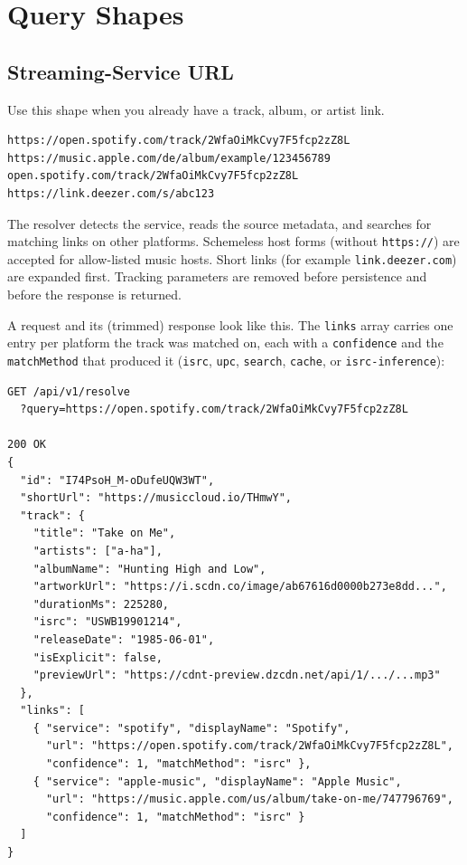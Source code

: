 \documentclass[11pt,a4paper]{article}
\newcommand{\code}[1]{\texttt{#1}}
\begin{document}
\section{Query Shapes}

\subsection{Streaming-Service URL}

Use this shape when you already have a track, album, or artist link.

\begingroup\small\begin{verbatim}
https://open.spotify.com/track/2WfaOiMkCvy7F5fcp2zZ8L
https://music.apple.com/de/album/example/123456789
open.spotify.com/track/2WfaOiMkCvy7F5fcp2zZ8L
https://link.deezer.com/s/abc123
\end{verbatim}\endgroup

The resolver detects the service, reads the source metadata, and searches for matching links on other platforms. Schemeless host forms (without \code{https://}) are accepted for allow-listed music hosts. Short links (for example \code{link.deezer.com}) are expanded first. Tracking parameters are removed before persistence and before the response is returned.

A request and its (trimmed) response look like this. The \code{links} array carries one entry per platform the track was matched on, each with a \code{confidence} and the \code{matchMethod} that produced it (\code{isrc}, \code{upc}, \code{search}, \code{cache}, or \code{isrc-inference}):

\begingroup\small\begin{verbatim}
GET /api/v1/resolve
  ?query=https://open.spotify.com/track/2WfaOiMkCvy7F5fcp2zZ8L

200 OK
{
  "id": "I74PsoH_M-oDufeUQW3WT",
  "shortUrl": "https://musiccloud.io/THmwY",
  "track": {
    "title": "Take on Me",
    "artists": ["a-ha"],
    "albumName": "Hunting High and Low",
    "artworkUrl": "https://i.scdn.co/image/ab67616d0000b273e8dd...",
    "durationMs": 225280,
    "isrc": "USWB19901214",
    "releaseDate": "1985-06-01",
    "isExplicit": false,
    "previewUrl": "https://cdnt-preview.dzcdn.net/api/1/.../...mp3"
  },
  "links": [
    { "service": "spotify", "displayName": "Spotify",
      "url": "https://open.spotify.com/track/2WfaOiMkCvy7F5fcp2zZ8L",
      "confidence": 1, "matchMethod": "isrc" },
    { "service": "apple-music", "displayName": "Apple Music",
      "url": "https://music.apple.com/us/album/take-on-me/747796769",
      "confidence": 1, "matchMethod": "isrc" }
  ]
}
\end{verbatim}\endgroup
\end{document}
